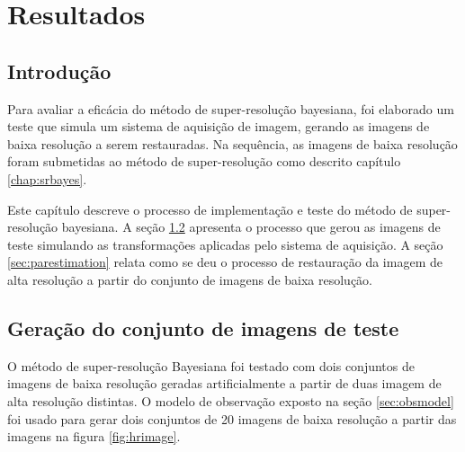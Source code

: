 \chapter{Resultados}
\label{chap:resultados}
\section{Introdução}
Para avaliar a eficácia do método de super-resolução bayesiana, 
foi elaborado um teste que simula um sistema de aquisição de imagem,
gerando as imagens de baixa resolução a serem restauradas.
Na sequência, as imagens de baixa resolução foram submetidas ao método de super-resolução como descrito capítulo \ref{chap:srbayes}.

Este capítulo descreve o processo de implementação e teste do método de super-resolução bayesiana.
A seção \ref{sec:gerimagens} apresenta o processo que gerou as imagens de teste simulando as transformações aplicadas pelo sistema de aquisição.
A seção \ref{sec:parestimation} relata como se deu o processo de restauração da imagem de alta resolução a partir do conjunto de imagens de baixa resolução.

\section{Geração do conjunto de imagens de teste}
\label{sec:gerimagens}

O método de super-resolução Bayesiana foi testado com dois conjuntos de imagens de
baixa resolução geradas artificialmente a partir de duas imagem de alta resolução
distintas.
O modelo de observação exposto na seção \ref{sec:obsmodel} foi usado para gerar dois conjuntos de 20 imagens de baixa resolução a partir das imagens na figura \ref{fig:hrimage}.


